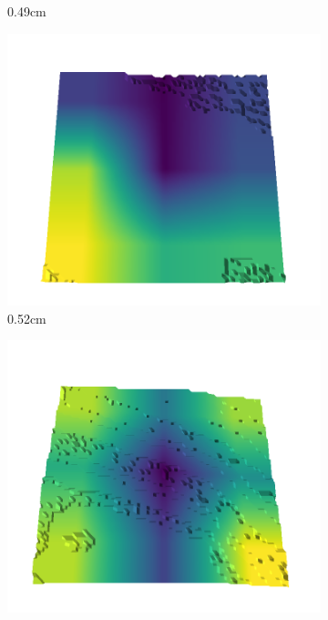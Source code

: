 \documentclass[../document.tex]{subfiles}
\begin{document}
\begin{figure}[H]
\begin{subfigure}[b]{0.192\linewidth}
    \caption{0.49cm}
    \label{fig : quarry-best-8}
    \end{subfigure}
    \begin{subfigure}[b]{0.192\linewidth}
    \includegraphics[width=\linewidth]{../img/5/quarry/best/51-patch-3d-majavi-colormap-90.png}
    \caption{0.52cm}
    \label{fig : quarry-best-9}
    \end{subfigure}
    \begin{subfigure}[b]{0.192\linewidth}
    \includegraphics[width=\linewidth]{../img/5/quarry/best/54-patch-3d-majavi-colormap-100.png}

\end{subfigure}
\end{figure}
\end{document}
